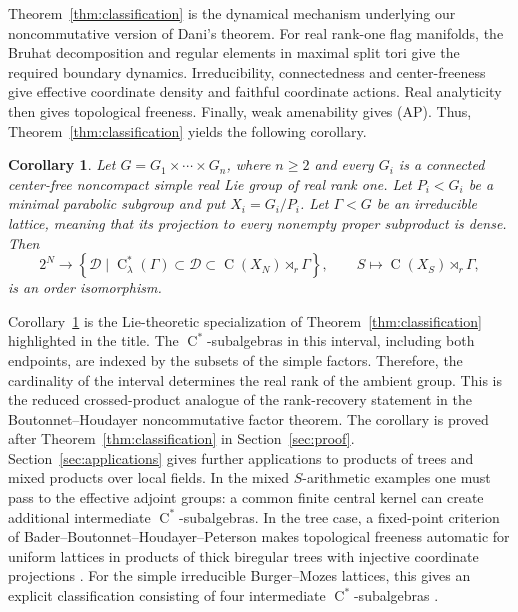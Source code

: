 \documentclass[11pt]{amsart}
\numberwithin{equation}{section}
\newcommand{\rC}{\operatorname{C}}
\newtheorem{maincorollary}{Corollary}
\theoremstyle{definition}
\begin{document}
	Theorem~\ref{thm:classification} is the dynamical mechanism underlying our noncommutative version of
	Dani's theorem. For real rank-one flag manifolds, the Bruhat decomposition and
	regular elements in maximal split tori give the required boundary dynamics.
	Irreducibility, connectedness and center-freeness give effective coordinate
	density and faithful coordinate actions. Real analyticity then gives
	topological freeness. Finally, weak amenability gives {\rm (AP)}. Thus,
	Theorem~\ref{thm:classification} yields the following corollary.
	
	\begin{maincorollary}\label{cor:dani-real-rank-one-direct}
		Let \(G=G_1\times\cdots\times G_n\), where \(n\geq2\) and every \(G_i\)
		is a connected center-free noncompact simple real Lie group
		of real rank one. Let \(P_i<G_i\) be a minimal parabolic subgroup and put
		\(X_i=G_i/P_i\). Let \(\Gamma<G\) be an irreducible lattice, meaning that its
		projection to every nonempty proper subproduct is dense. Then
		\[
		2^N\longrightarrow
		\left\{\mathcal D\mid
		\rC^*_{\lambda}(\Gamma)\subset\mathcal D\subset
		\rC(X_N)\rtimes_r\Gamma\right\},
		\qquad
		S\longmapsto\rC(X_S)\rtimes_r\Gamma,
		\]
		is an order isomorphism.
	\end{maincorollary}
	
	Corollary~\ref{cor:dani-real-rank-one-direct} is the Lie-theoretic specialization of
	Theorem~\ref{thm:classification} highlighted in the
	title. The \(\rC^*\)-subalgebras in this interval, including both endpoints, are
	indexed by the subsets of the simple factors.
	Therefore, the cardinality of the interval determines the real rank of the
	ambient group. This is the reduced crossed-product analogue of the
	rank-recovery statement in the Boutonnet--Houdayer noncommutative factor
	theorem. The corollary is proved after
	Theorem~\ref{thm:classification} in
	Section~\ref{sec:proof}.
	Section~\ref{sec:applications} gives further applications to products of trees
	and mixed products over local fields. In the mixed \(S\)-arithmetic examples
	one must pass to the effective
	adjoint groups: a common finite central kernel can create additional intermediate
	\(\rC^*\)-subalgebras. In the tree case, a fixed-point criterion of
	Bader--Boutonnet--Houdayer--Peterson makes topological freeness automatic for
	uniform lattices in products of thick biregular trees with injective coordinate
	projections \cite[Proposition~6.4]{BBHP22}. For the simple irreducible
	Burger--Mozes lattices, this gives an explicit classification consisting of four
	intermediate \(\rC^*\)-subalgebras \cite{BM00b}.
	
\end{document}
